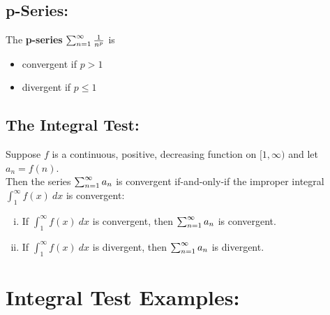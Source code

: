 \documentclass[10pt]{article}
\begin{document}
\vspace*{.2in}

\subsection*{p-Series:}

The \textbf{p-series} \(\sum_{n=1}^\infty \frac{1}{n^p}\) is\\
\begin{itemize}
\item convergent if \(p>1\)
\item divergent if \(p\leq 1\)
\end{itemize}






\subsection*{The Integral Test:}
Suppose \(f\) is a continuous, positive, decreasing function on \([1,\infty)\) and let \(a_n = f(n)\).\\
 Then the series \(\sum_{n=1}^\infty a_n\) is convergent if-and-only-if the improper integral \(\int_1^\infty f(x)\ dx\) is convergent:
\begin{enumerate}[(i)]
\item If \(\int_1^\infty f(x)\ dx\) is convergent, then \(\sum_{n=1}^\infty a_n\) is convergent.
\item If \(\int_1^\infty f(x)\ dx\) is divergent, then \(\sum_{n=1}^\infty a_n\) is divergent.
\end{enumerate}






\section*{Integral Test Examples:}
\end{document}
